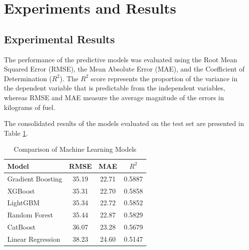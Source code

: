 \section{Experiments and Results}
\label{sec:experiments_results}

\subsection{Experimental Results}
The performance of the predictive models was evaluated using the Root Mean Squared Error (RMSE), the Mean Absolute Error (MAE), and the Coefficient of Determination ($R^2$). The $R^2$ score represents the proportion of the variance in the dependent variable that is predictable from the independent variables, whereas RMSE and MAE measure the average magnitude of the errors in kilograms of fuel.

The consolidated results of the models evaluated on the test set are presented in Table \ref{tab:models_summary}.

\begin{table}[htbp]
\caption{Comparison of Machine Learning Models}
\label{tab:models_summary}
\centering
\begin{tabular}{lccc}
\hline
\textbf{Model} & \textbf{RMSE} & \textbf{MAE} & \textbf{$R^2$} \\
\hline
Gradient Boosting & 35.19 & 22.71 & 0.5887 \\
XGBoost & 35.31 & 22.70 & 0.5858 \\
LightGBM & 35.34 & 22.72 & 0.5852 \\
Random Forest & 35.44 & 22.87 & 0.5829 \\
CatBoost & 36.07 & 23.28 & 0.5679 \\
Linear Regression & 38.23 & 24.60 & 0.5147 \\
\hline
\end{tabular}
\end{table}



